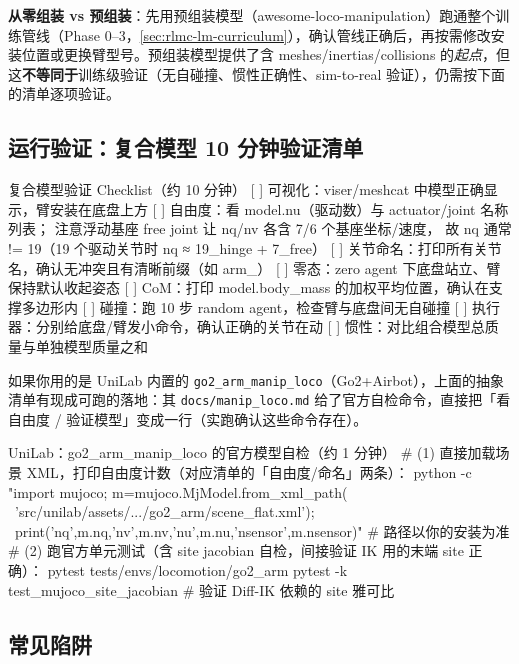 \textbf{从零组装 vs 预组装}：先用预组装模型（awesome-loco-manipulation）跑通整个训练管线（Phase 0--3，\cref{sec:rlmc-lm-curriculum}），确认管线正确后，再按需修改安装位置或更换臂型号。预组装模型提供了含 meshes/inertias/collisions 的\emph{起点}，但这\textbf{不等同于}训练级验证（无自碰撞、惯性正确性、sim-to-real 验证），仍需按下面的清单逐项验证。

\subsection{运行验证：复合模型 10 分钟验证清单}
\label{sec:rlmc-lm-asset-verify}

\begin{codebox}[text]{复合模型验证 Checklist（约 10 分钟）}
[ ] 可视化：viser/meshcat 中模型正确显示，臂安装在底盘上方
[ ] 自由度：看 model.nu（驱动数）与 actuator/joint 名称列表；
    注意浮动基座 free joint 让 nq/nv 各含 7/6 个基座坐标/速度，
    故 nq 通常 != 19（19 个驱动关节时 nq ≈ 19_hinge + 7_free）
[ ] 关节命名：打印所有关节名，确认无冲突且有清晰前缀（如 arm_）
[ ] 零态：zero agent 下底盘站立、臂保持默认收起姿态
[ ] CoM：打印 model.body_mass 的加权平均位置，确认在支撑多边形内
[ ] 碰撞：跑 10 步 random agent，检查臂与底盘间无自碰撞
[ ] 执行器：分别给底盘/臂发小命令，确认正确的关节在动
[ ] 惯性：对比组合模型总质量与单独模型质量之和
\end{codebox}

如果你用的是 UniLab 内置的 \verb|go2_arm_manip_loco|（Go2+Airbot），上面的抽象清单有现成可跑的落地：其 \verb|docs/manip_loco.md| 给了官方自检命令，直接把「看自由度 / 验证模型」变成一行（实跑确认这些命令存在）。

\begin{codebox}[bash]{UniLab：go2\_arm\_manip\_loco 的官方模型自检（约 1 分钟）}
# (1) 直接加载场景 XML，打印自由度计数（对应清单的「自由度/命名」两条）：
python -c "import mujoco; m=mujoco.MjModel.from_xml_path( \
  'src/unilab/assets/.../go2_arm/scene_flat.xml'); \
  print('nq',m.nq,'nv',m.nv,'nu',m.nu,'nsensor',m.nsensor)"   # 路径以你的安装为准
# (2) 跑官方单元测试（含 site jacobian 自检，间接验证 IK 用的末端 site 正确）：
pytest tests/envs/locomotion/go2_arm
pytest -k test_mujoco_site_jacobian          # 验证 Diff-IK 依赖的 site 雅可比
\end{codebox}

\subsection{常见陷阱}
\label{sec:rlmc-lm-asset-pitfalls}

